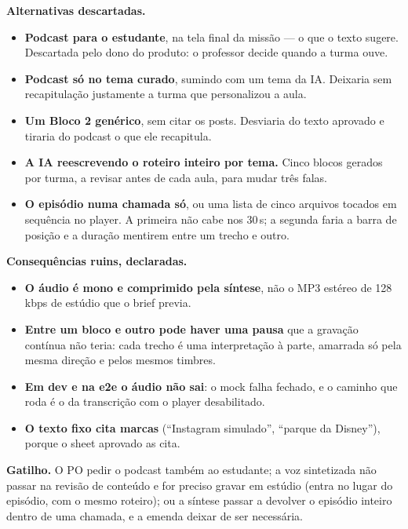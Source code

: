 \textbf{Alternativas descartadas.}

\begin{itemize}
  \item \textbf{Podcast para o estudante}, na tela final da missão --- o que o
    texto sugere. Descartada pelo dono do produto: o professor decide quando a
    turma ouve.
  \item \textbf{Podcast só no tema curado}, sumindo com um tema da IA. Deixaria
    sem recapitulação justamente a turma que personalizou a aula.
  \item \textbf{Um Bloco 2 genérico}, sem citar os posts. Desviaria do texto
    aprovado e tiraria do podcast o que ele recapitula.
  \item \textbf{A IA reescrevendo o roteiro inteiro por tema.} Cinco blocos
    gerados por turma, a revisar antes de cada aula, para mudar três falas.
  \item \textbf{O episódio numa chamada só}, ou uma lista de cinco arquivos
    tocados em sequência no player. A primeira não cabe nos 30\,s; a segunda
    faria a barra de posição e a duração mentirem entre um trecho e outro.
\end{itemize}

\textbf{Consequências ruins, declaradas.}

\begin{itemize}
  \item \textbf{O áudio é mono e comprimido pela síntese}, não o MP3 estéreo de
    128\,kbps de estúdio que o brief previa.
  \item \textbf{Entre um bloco e outro pode haver uma pausa} que a gravação
    contínua não teria: cada trecho é uma interpretação à parte, amarrada só pela
    mesma direção e pelos mesmos timbres.
  \item \textbf{Em dev e na e2e o áudio não sai}: o mock falha fechado, e o
    caminho que roda é o da transcrição com o player desabilitado.
  \item \textbf{O texto fixo cita marcas} (\enquote{Instagram simulado},
    \enquote{parque da Disney}), porque o sheet aprovado as cita.
\end{itemize}

\textbf{Gatilho.} O PO pedir o podcast também ao estudante; a voz sintetizada
não passar na revisão de conteúdo e for preciso gravar em estúdio (entra no
lugar do episódio, com o mesmo roteiro); ou a síntese passar a devolver o
episódio inteiro dentro de uma chamada, e a emenda deixar de ser necessária.

